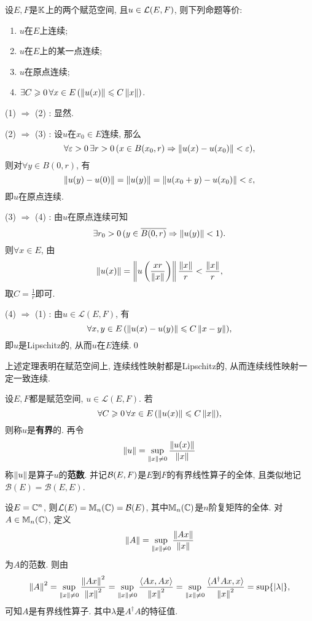 	\begin{Theorem}[连续性]\label{thm:线性算子连续性}
	设$ E, F $是$ \mathbb{K} $上的两个赋范空间, 且$ u\in\mathcal{L}(E,F) $, 则下列命题等价:
	\begin{enumerate}[(1)]
	\item $ u $在$ E $上连续;
	\item $ u $在$ E $上的某一点连续;
	\item $ u $在原点连续;
	\item $ \exists C\geqslant 0\,\forall x\in E\,(\left\| u(x) \right\|\leqslant C\left\| x \right\|) $.
	\end{enumerate}
	\end{Theorem}
	\begin{Proof}
		(1) $ \Rightarrow $ (2) : 显然.
		
		(2) $ \Rightarrow $ (3) : 设$ u $在$ x_0\in E $连续, 那么
		\[
			\forall\varepsilon>0\,\exists r>0\,(x\in B(x_0,r)\Rightarrow\left\| u(x)-u(x_0) \right\|<\varepsilon),
		\]
		则对$ \forall y\in B(0,r) $, 有
		\[
			\left\| u(y)-u(0) \right\|=\left\| u(y) \right\|=\left\| u(x_0+y)-u(x_0) \right\|<\varepsilon,
		\]
		即$ u $在原点连续.
		
		(3) $ \Rightarrow $ (4) : 由$ u $在原点连续可知
		\[
			\exists r_0>0\,(y\in\overline{B(0,r)}\Rightarrow\left\| u(y) \right\|<1).
		\]
		则$ \forall x\in E $, 由
		\[
			\left\| u(x) \right\|=\left\| u\left(\dfrac{xr}{\left\| x \right\|}\right) \right\|\frac{\left\| x \right\|}{r}<\frac{\left\| x \right\|}{r},
		\]
		取$ C=\frac{1}{r} $即可.
		
		(4) $ \Rightarrow $ (1) : 由$ u\in\mathcal{L}(E,F) $, 有
		\[
			\forall x,y\in E\,(\left\| u(x)-u(y) \right\|\leqslant C\left\| x-y \right\|),
		\]
		即$ u $是Lipschitz的, 从而$ u $在$ E $连续.\qed
	\end{Proof}
	
	\begin{Remark}
		上述定理表明在赋范空间上, 连续线性映射都是Lipschitz的, 从而连续线性映射一定一致连续.
	\end{Remark}
	
	\begin{Definition}[算子范数]
		设$ E,F $都是赋范空间, $ u\in\mathcal{L}(E,F) $. 若
		\[
			\forall C\geqslant 0\,\forall x\in E\,(\left\| u(x) \right\|\leqslant C\left\| x \right\|),
		\]
		则称$ u $是\textbf{有界}的. 再令
		\[
			\left\| u \right\|=\sup_{\left\| x \right\|\ne 0}\frac{\left\| u(x) \right\|}{\left\| x \right\|}
		\]
		称$ \left\| u \right\| $是算子$ u $的\textbf{范数}. 并记$ \mathcal{B}(E,F) $是$ E $到$ F $的有界线性算子的全体, 且类似地记$ \mathcal{B}(E)=\mathcal{B}(E,E) $.
	\end{Definition}
	
	\begin{Example}
		设$ E=\mathbb{C}^n $, 则$ \mathcal{L}(E)=\mathbb{M}_n(\mathbb{C})=\mathcal{B}(E) $, 其中$ \mathbb{M}_n(\mathbb{C}) $是$ n $阶复矩阵的全体. 对$ A\in\mathbb{M}_n(\mathbb{C}) $, 定义
		\[
			\left\| A \right\|=\sup_{\left\| x \right\|\ne 0}\frac{\left\| Ax \right\|}{\left\| x \right\|}
		\]
		为$ A $的范数. 则由
		\[
			\left\| A \right\|^2=\sup_{\left\| x \right\|\ne 0}\frac{\left\| Ax \right\|^2}{\left\| x \right\|^2}=\sup_{\left\| x \right\|\ne 0}\frac{\langle Ax,Ax \rangle}{\left\| x \right\|^2}=\sup_{\left\| x \right\|\ne 0}\frac{\langle A^\dagger Ax,x \rangle}{\left\| x \right\|^2}=\sup\{\left| \lambda \right| \},
		\]
		可知$ A $是有界线性算子. 其中$ \lambda $是$ A^\dagger A $的特征值.
	\end{Example}
	
